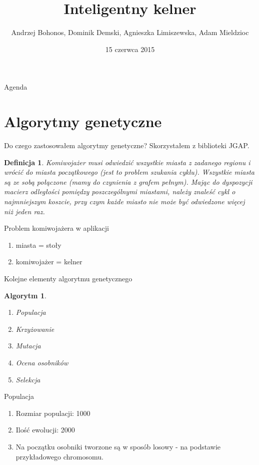 \documentclass[a4paper,10pt]{beamer}
\date{15 czerwca 2015}
\title{Inteligentny kelner}
\author[A. Bohonos, D. Demski, A. Limiszewska, A. Mieldzioc]{Andrzej Bohonos, Dominik Demski, Agnieszka Limiszewska, Adam Mieldzioc}
\newtheorem{defi}{Definicja}[subsection]
\newtheorem{alg}{Algorytm}[subsection]
\begin{document}
		\begin{frame}
			\titlepage
		\end{frame}
		\begin{frame}{Agenda}
			\tableofcontents
		\end{frame}
		
		\section{Algorytmy genetyczne}
		\begin{frame}{Do czego zastosowałem algorytmy genetyczne?}
			Skorzystałem z biblioteki JGAP.
			\begin{defi}
				Komiwojażer musi odwiedzić wszystkie miasta z zadanego regionu i wrócić do miasta początkowego (jest to problem szukania cyklu). Wszystkie miasta są ze sobą połączone (mamy do czynienia z grafem pełnym). Mając do dyspozycji macierz odległości pomiędzy poszczególnymi miastami, należy znaleść cykl o najmniejszym koszcie, przy czym każde miasto nie może być odwiedzone więcej niż jeden raz.
			\end{defi}
			
		\end{frame}
		\begin{frame}{Problem komiwojażera w aplikacji}
			\begin{enumerate}
				\item miasta = stoły
				\item komiwojażer = kelner
			\end{enumerate}
		\end{frame}
		\begin{frame}{Kolejne elementy algorytmu genetycznego}
			\begin{alg}
				\begin{enumerate}
					\item Populacja
					\item Krzyżowanie
					\item Mutacja
					\item Ocena osobników
					\item Selekcja
				\end{enumerate}
			\end{alg}
		\end{frame}
		\begin{frame}{Populacja}
			\begin{enumerate}
				\item Rozmiar populacji: 1000
				\item Ilość ewolucji: 2000
				\item Na początku osobniki tworzone są w sposób losowy - na podstawie przykładowego chromosomu.
			\end{enumerate}
		\end{frame}
\end{document}
